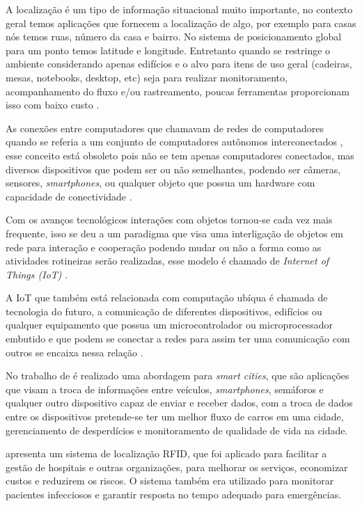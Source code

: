 

A localização é um tipo de informação situacional muito importante, no contexto geral temos aplicações que fornecem a
localização de algo, por exemplo para casas nós temos ruas, número da casa e bairro. No sistema de posicionamento global
para um ponto temos latitude e longitude. Entretanto quando se restringe o ambiente considerando apenas edifícios e o
alvo para itens de uso geral (cadeiras, mesas, notebooks, desktop, etc) seja para realizar monitoramento, acompanhamento do
fluxo e/ou rastreamento, poucas ferramentas proporcionam isso com baixo custo \cite{rfid2009review}.


As conexões entre computadores que chamavam de
redes de computadores quando se referia a um conjunto de computadores autônomos interconectados \cite{tenenbaum2002},
esse conceito está obsoleto pois não se tem apenas computadores conectados, mas diversos dispositivos que podem ser ou
não semelhantes, podendo ser câmeras, sensores, \textit{smartphones}, ou qualquer objeto que possua um
hardware com capacidade de conectividade \cite{iot2016SBRC}.


Com os avanços tecnológicos interações com objetos tornou-se cada vez mais frequente, isso se deu a um paradigma
que visa uma interligação de objetos em rede para interação e cooperação podendo mudar ou não a forma como as atividades
rotineiras serão realizadas, esse modelo é chamado de \textit{Internet of Things (IoT)} \cite{realtimeRFID2016}.


A IoT que também está relacionada com computação ubíqua é chamada de tecnologia do futuro, a comunicação de diferentes dispositivos,
edifícios ou qualquer equipamento que possua um microcontrolador ou microprocessador embutido e que podem se conectar a
redes para assim ter uma comunicação com outros se encaixa nessa relação
\cite{mechanismRFID2006}.


No trabalho de  é realizado uma abordagem para \textit{smart cities}, que são
aplicações que visam a troca de informações entre veículos, \textit{smartphones}, semáforos e qualquer
outro dispositivo capaz de enviar e receber dados, com a troca de dados entre os dispositivos pretende-se
ter um melhor fluxo de carros em uma cidade, gerenciamento de desperdícios e monitoramento de qualidade de vida na cidade.


 apresenta um sistema de localização RFID, que foi aplicado para facilitar a gestão de
hospitais e outras organizações, para melhorar os serviços, economizar custos e reduzirem os riscos. O sistema também era
utilizado para monitorar pacientes infecciosos e garantir resposta no tempo adequado para emergências.


